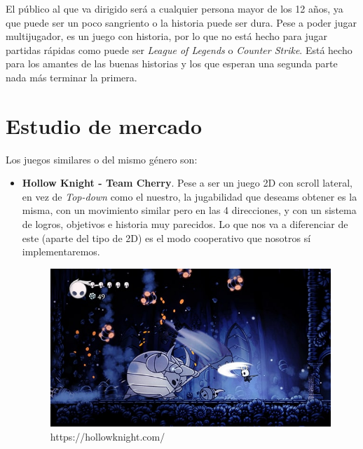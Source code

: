 \documentclass[11pt,a4paper]{article}
\begin{document}
El público al que va dirigido será a cualquier persona mayor de los 12 años, ya que puede ser un poco
sangriento o la historia puede ser dura. Pese a poder jugar multijugador, es un juego con historia, por
lo que no está hecho para jugar partidas rápidas como puede ser \textit{League of Legends} o \textit{Counter
Strike}. Está hecho para los amantes de las buenas historias y los que esperan una segunda parte nada más
terminar la primera.

\section*{Estudio de mercado}

Los juegos similares o del mismo género son:
\begin{itemize}
    \item \textbf{Hollow Knight - Team Cherry}. Pese a ser un juego 2D con scroll lateral, en vez de \textit{Top-down}
    como el nuestro, la jugabilidad que deseams obtener es la misma, con un movimiento similar pero en
    las 4 direcciones, y con un sistema de logros, objetivos e historia muy parecidos. Lo que nos va a
    diferenciar de este (aparte del tipo de 2D) es el modo cooperativo que nosotros sí implementaremos.
    \begin{figure}[H]
        \centering
        \includegraphics[scale=0.6]{img/hollow.jpg}
        \caption{https://hollowknight.com/}
    \end{figure}


\end{itemize}
\end{document}
